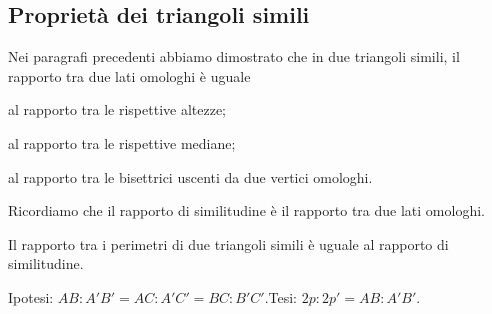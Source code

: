 \subsection{Proprietà dei triangoli simili}

Nei paragrafi precedenti abbiamo dimostrato che in due triangoli 
simili, il rapporto tra due lati omologhi è uguale
\begin{itemize*}
\noindent\begin{minipage}{0.35\textwidth}\parindent15pt
\item al rapporto tra le rispettive altezze;
\end{minipage}\hfil
\begin{minipage}{0.65\textwidth}
	\centering
\end{minipage}\vspace{5pt}
\noindent\begin{minipage}{0.35\textwidth}\parindent15pt
\item al rapporto tra le rispettive mediane;
\end{minipage}\hfil
\begin{minipage}{0.65\textwidth}
	\centering
\end{minipage}\vspace{5pt}
\noindent\begin{minipage}{0.35\textwidth}\parindent15pt
\item al rapporto tra le bisettrici uscenti da due vertici omologhi.
\end{minipage}\hfil
\begin{minipage}{0.65\textwidth}
	\centering
\end{minipage}\vspace{5pt}
\end{itemize*}

Ricordiamo che il rapporto di similitudine è il rapporto tra due lati 
omologhi.

\begin{teorema}\label{teo:6.3}%
Il rapporto tra i perimetri di due triangoli simili è uguale al 
rapporto di similitudine.
\end{teorema}

\noindent Ipotesi: $AB:A'B'=AC:A'C'=BC:B'C'$.\tab Tesi: $2p : 2p' = 
AB : A'B'$.

\begin{figure*}[!htb]
	\centering
\end{figure*}

